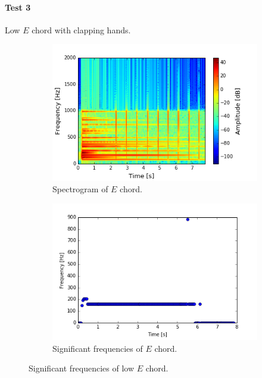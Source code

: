 \paragraph{Test 3} Low $E$ chord with clapping hands.
\begin{figure}[H]
\centering
\begin{subfigure}{0.49\textwidth}
\centering
\includegraphics[width=\textwidth]{figures/validation/systemtest/final_spec3.png}
\caption{Spectrogram of $E$ chord.}
\label{fig:final_spec2}
\end{subfigure}
\begin{subfigure}{0.49\textwidth}
\centering
\includegraphics[width=\textwidth]{figures/validation/systemtest/final_peak3.png}
\caption{Significant frequencies of $E$ chord.}
\label{fig:final_peak2}
\end{subfigure}
\caption{Significant frequencies of low $E$ chord.}
\label{fig:final_2}
\end{figure}

